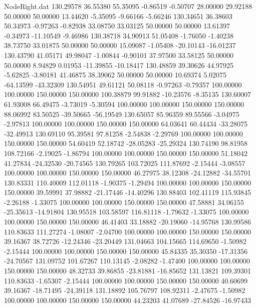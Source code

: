 \begin{filecontents}{NodeRight.dat}
 130.29578   36.55380   55.35095    -0.86519   -0.50707   28.00000   29.92188   50.00000   50.00000   13.44620   -5.35095   -9.66166   -5.66246
 130.34651   36.38603   50.34973    -0.97263   -0.82938   33.08750   33.03125   50.00000   50.00000   13.61397   -0.34973  -11.10549   -9.46986
 130.38718   34.90913   51.05408    -1.76050   -1.40238   38.73750   33.01875   50.00000   50.00000   15.09087   -1.05408  -20.10143  -16.01237
 130.43790   41.05171   49.98047    -1.00844   -0.90101   37.97500   33.58125   50.00000   50.00000    8.94829    0.01953  -11.39855  -10.18417
 130.48859   39.30626   44.97925    -5.62825   -3.80181   41.46875   38.39062   50.00000   50.00000   10.69374    5.02075  -64.13599  -43.32309
 130.54951   49.61121   50.08118    -0.97263   -0.79357  100.00000  100.00000  150.00000  150.00000  100.38879   99.91882  -10.23576   -8.35135
 130.60007   61.93008   66.49475    -3.73019   -5.30594  100.00000  100.00000  150.00000  150.00000   88.06992   83.50525  -39.50665  -56.19549
 130.65057   85.96359   89.55566    -3.04975   -2.97813  100.00000  100.00000  150.00000  150.00000   64.03641   60.44434  -33.28075  -32.49913
 130.69110   95.39581   97.81258    -2.54838   -2.29769  100.00000  100.00000  150.00000  150.00000   54.60419   52.18742  -28.05283  -25.29324
 130.74190   98.81958  108.72166    -2.19025   -1.86794  100.00000  100.00000  150.00000  150.00000   51.18042   41.27834  -24.32530  -20.74565
 130.79265  103.72025  111.87692    -2.15444   -3.08557  100.00000  100.00000  150.00000  150.00000   46.27975   38.12308  -24.12882  -34.55701
 130.83331  110.40009  112.01118    -1.90375   -1.29494  100.00000  100.00000  150.00000  150.00000   39.59991   37.98882  -21.17446  -14.40296
 130.88403  102.41119  115.93845    -2.26188   -1.33075  100.00000  100.00000  150.00000  150.00000   47.58881   34.06155  -25.35613  -14.91804
 130.95518  103.58597  116.81118    -1.79632   -1.33075  100.00000  100.00000  150.00000  150.00000   46.41403   33.18882  -20.19060  -14.95768
 130.99586  110.83633  111.27274    -1.08007   -2.04700  100.00000  100.00000  150.00000  150.00000   39.16367   38.72726  -12.24346  -23.20449
 131.04663  104.15665  114.69650    -1.50982   -2.15444  100.00000  100.00000  150.00000  150.00000   45.84335   35.30350  -17.31356  -24.70567
 131.09752  101.67267  110.13145    -2.08282   -1.47400  100.00000  100.00000  150.00000  150.00000   48.32733   39.86855  -23.81881  -16.85652
 131.13821  109.39301  110.83633    -1.65307   -2.15444  100.00000  100.00000  150.00000  150.00000   40.60699   39.16367  -18.71495  -24.39118
 131.18892  105.76797  108.92311    -2.47675   -1.50982  100.00000  100.00000  150.00000  150.00000   44.23203   41.07689  -27.84526  -16.97433

\end{filecontents}
